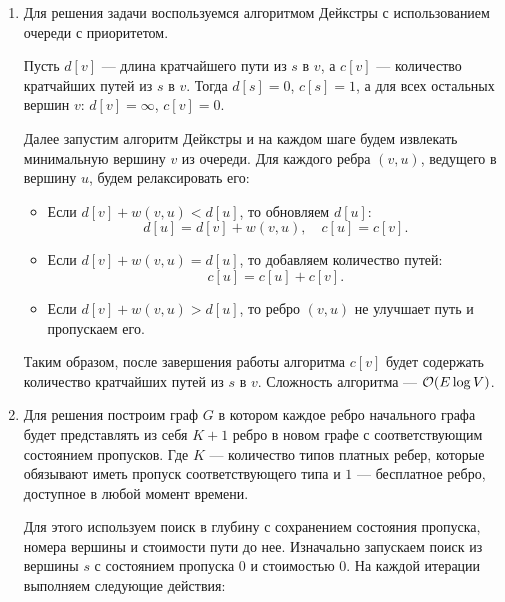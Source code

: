 \begin{enumerate}

    \item
        Для решения задачи воспользуемся алгоритмом Дейкстры с использованием очереди с приоритетом.

        Пусть $d[v]$ --- длина кратчайшего пути из $s$ в $v$, а $c[v]$ --- количество кратчайших путей из $s$ в $v$.
        Тогда $d[s] = 0$, $c[s] = 1$, а для всех остальных вершин $v$: $d[v] = \infty$, $c[v] = 0$.

        Далее запустим алгоритм Дейкстры и на каждом шаге будем извлекать минимальную вершину $v$ из очереди.
        Для каждого ребра $(v, u)$, ведущего в вершину $u$, будем релаксировать его:

        \begin{itemize}
            \item Если $d[v] + w(v, u) < d[u]$, то обновляем $d[u]$:
            \[
            d[u] = d[v] + w(v, u), \quad c[u] = c[v].
            \]
            \item Если $d[v] + w(v, u) = d[u]$, то добавляем количество путей:
            \[
            c[u] = c[u] + c[v].
            \]
            \item Если $d[v] + w(v, u) > d[u]$, то ребро $(v, u)$ не улучшает путь и пропускаем его.
        \end{itemize}

        Таким образом, после завершения работы алгоритма $c[v]$ будет содержать количество кратчайших путей из $s$ в $v$.
        Сложность алгоритма --- $\mathcal{O}(E \log V)$.

    \item

        Для решения построим граф $G$ в котором каждое ребро начального графа будет представлять из себя $K + 1$
        ребро в новом графе с соответствующим состоянием пропусков.
        Где $K$ --- количество типов платных ребер, которые обязывают иметь пропуск соответствующего типа и $1$ --- бесплатное ребро,
        доступное в любой момент времени.

        Для этого используем поиск в глубину с сохранением состояния пропуска, номера вершины и стоимости пути до нее.
        Изначально запускаем поиск из вершины $s$ с состоянием пропуска $0$ и стоимостью $0$.
        На каждой итерации выполняем следующие действия:
        \begin{enumerate}


\end{enumerate}
\end{enumerate}

